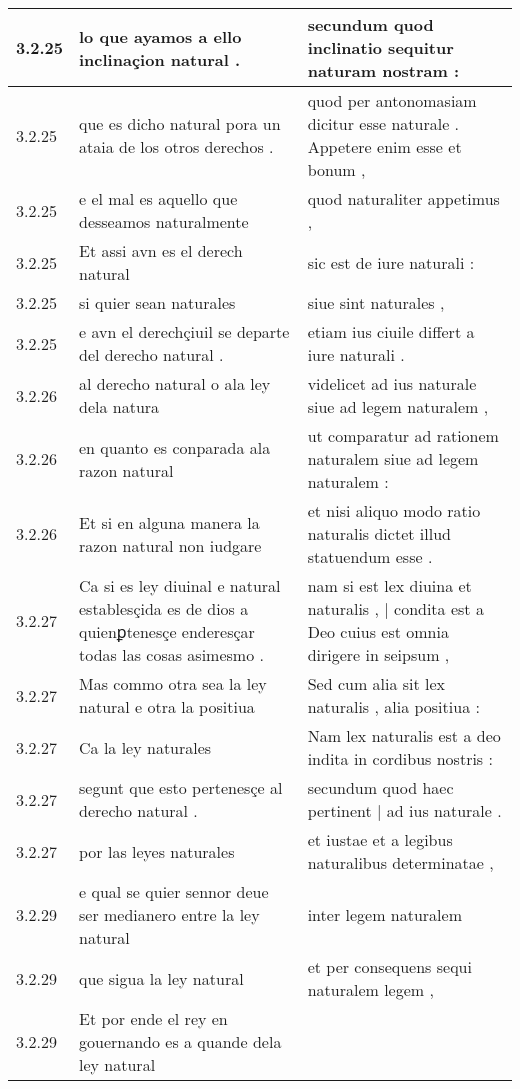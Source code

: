 \begin{tabular}{|p{1cm}|p{6.5cm}|p{6.5cm}|}
3.2.25 & lo que ayamos a ello inclinaçion natural . & secundum quod inclinatio sequitur naturam nostram : \\\hline
3.2.25 & que es dicho natural pora un ataia de los otros derechos . & quod per antonomasiam dicitur esse naturale . Appetere enim esse et bonum , \\\hline
3.2.25 & e el mal es aquello que desseamos naturalmente & quod naturaliter appetimus , \\\hline
3.2.25 & Et assi avn es el derech natural & sic est de iure naturali : \\\hline
3.2.25 & si quier sean naturales & siue sint naturales , \\\hline
3.2.25 & e avn el derechçiuil se departe del derecho natural . & etiam ius ciuile differt a iure naturali . \\\hline
3.2.26 & al derecho natural o ala ley dela natura & videlicet ad ius naturale siue ad legem naturalem , \\\hline
3.2.26 & en quanto es conparada ala razon natural & ut comparatur ad rationem naturalem siue ad legem naturalem : \\\hline
3.2.26 & Et si en alguna manera la razon natural non iudgare & et nisi aliquo modo ratio naturalis dictet illud statuendum esse . \\\hline
3.2.27 & Ca si es ley diuinal e natural establesçida es de dios a quienꝑtenesçe enderesçar todas las cosas asimesmo . & nam si est lex diuina et naturalis , | condita est a Deo cuius est omnia dirigere in seipsum , \\\hline
3.2.27 & Mas commo otra sea la ley natural e otra la positiua & Sed cum alia sit lex naturalis , alia positiua : \\\hline
3.2.27 & Ca la ley naturales & Nam lex naturalis est a deo indita in cordibus nostris : \\\hline
3.2.27 & segunt que esto pertenesçe al derecho natural . & secundum quod haec pertinent | ad ius naturale . \\\hline
3.2.27 & por las leyes naturales & et iustae et a legibus naturalibus determinatae , \\\hline
3.2.29 & e qual se quier sennor deue ser medianero entre la ley natural & inter legem naturalem \\\hline
3.2.29 & que sigua la ley natural & et per consequens sequi naturalem legem , \\\hline
3.2.29 & Et por ende el rey en gouernando es a quande dela ley natural &  \\\hline

\end{tabular}
